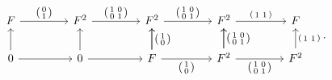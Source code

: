 \documentclass[a4paper]{amsart}
\theoremstyle{plain}
\theoremstyle{definition}
\theoremstyle{remark}
\begin{document}
\[
\begin{tikzcd}[column sep=15mm, ampersand replacement=\&]
F \ar{r}{\left(\begin{smallmatrix} 0 \\ 1 \end{smallmatrix}\right)} \& F^2\ar{r}{\left(\begin{smallmatrix} 1 & 0 \\ 0 & 1 \end{smallmatrix}\right)} \& F^2 \ar{r}{\left(\begin{smallmatrix} 1 & 0 \\ 0 & 1\end{smallmatrix}\right)}\& F^2\ar{r}{\left(\begin{smallmatrix} 1 & 1 \end{smallmatrix}\right)} \& F\\
0\ar[u]\ar[r] \& 0\ar[u]\ar[r] \& F\ar[u]\ar{r}[swap]{\left(\begin{smallmatrix} 1 \\ 0 \end{smallmatrix}\right)} \ar{u}[swap]{\left(\begin{smallmatrix}1 \\ 0 \end{smallmatrix}\right)} \& F^2\ar[u]\ar{r}[swap]{\left(\begin{smallmatrix} 1 & 0\\ 0 & 1\end{smallmatrix}\right)}\ar{u}[swap]{\left(\begin{smallmatrix} 1 & 0 \\ 0 & 1 \end{smallmatrix}\right)} \& F^2\ar{u}[swap]{\left(\begin{smallmatrix}  1 & 1 \end{smallmatrix}\right)}
\end{tikzcd}.
\]
\end{document}

